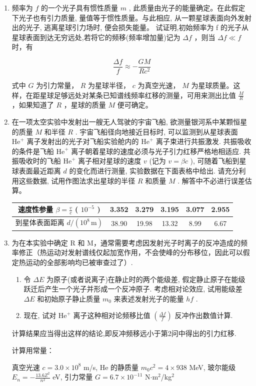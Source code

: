 \begin{enumerate}
\item 频率为 $f$ 的一个光子具有惯性质量 $m$ , 此质量由光子的能量确定。在此假定下光子也有引力质量, 量值等于惯性质量。与此相应, 从一颗星球表面向外发射出的光子, 逃离星球引力场时, 便会损失能量。
试证明,初始频率为 f 的光子从星球表面到达无穷远处,若将它的频移(频率增加量)记为
$\Delta f$ ，则当 $\Delta f\ll f$ 时，有

$$
\frac {\Delta f}{f} \approx - \frac {G M}{R c ^ {2}}
$$

式中 $G$ 为引力常量， $R$ 为星球半径， $c$ 为真空光速， $M$ 为星球质量。这样，在距星球足够远处对某条已知谱线频率红移的测量，可用来测出比值 $\frac{M}{R}$ ，如果知道了 $R$ ，星球的质量 $M$ 便可确定。

\item 在一项太空实验中发射出一艘无人驾驶的宇宙飞船, 欲测量银河系中某颗恒星的质量 $M$ 和半径 $R$ . 宇宙飞船径向地接近目标时, 可以监测到从星球表面 $\mathrm{He}^{+}$ 离子发射出的光子对飞船实验舱内的 $\mathrm{He}^{+}$ 离子束进行共振激发. 共振吸收的条件是飞船 $\mathrm{He}^{+}$ 离子朝着星球的速度必须与光子引力红移严格地相适应. 共振吸收时的飞船 $\mathrm{He}^{+}$ 离子相对星球的速度 $v$ (记为 $v = \beta c$ ), 可随着飞船到星球表面最近距离 $d$ 的变化而进行测量, 实验数据在下面表格中给出. 请充分利用这些数据, 试用作图法求出星球的半径 $R$ 和质量 $M$ . 解答中不必进行误差估算。

\begin{center}
\begin{tabular}{|c|c|c|c|c|c|}
\hline
速度性参量 $\beta = \frac{v}{c}$ ( $10^{-5}$ ) & 3.352 & 3.279 & 3.195 & 3.077 & 2.955 \\
\hline
到星体表面距离 $d/(10^{8}\,\mathrm{m})$ & 38.90 & 19.98 & 13.32 & 8.99 & 6.67 \\
\hline
\end{tabular}
\end{center}

\item 为在本实验中确定 R 和 M，通常需要考虑因发射光子时离子的反冲造成的频率修正（热运动对发射谱线仅起加宽作用，不会使峰的分布移位，因此可以假定热运动的全部影响均已被审查过了）.
\begin{enumerate}
\item 令 $\Delta E$ 为原子(或者说离子)在静止时的两个能级差, 假定静止原子在能级跃迁后产生一个光子并形成一个反冲原子. 考虑相对论效应, 试用能级差 $\Delta E$ 和初始原子静止质量 $m_0$ 来表述发射光子的能量 $hf$ .
\item 现在, 试对 $\mathrm{He}^{+}$ 离子这种相对论频移比值 $\left(\frac{\Delta f}{f}\right)$ 反冲作出数值计算.
\end{enumerate}
计算结果应当得出这样的结论,即反冲频移远小于第2问中得出的引力红移.

计算用常量：

真空光速 $c=3.0\times10^{8}$ m/s, He 的静质量 $m_{0}c^{2}=4\times938$ MeV, 玻尔能级 $E_{n}=-\frac{13.6Z^{2}}{n^{2}}$ eV, 引力常量 $G=6.7\times10^{-11}$ N$\cdot$m$^2$/kg$^2$
\end{enumerate}
\vfill